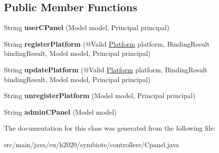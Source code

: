 \subsection*{Public Member Functions}
\begin{DoxyCompactItemize}
\item 
String {\bfseries user\+C\+Panel} (Model model, Principal principal)\hypertarget{classeu_1_1h2020_1_1symbiote_1_1controller_1_1Cpanel_a009092cae8a35727082ffced5b0fcc81}{}\label{classeu_1_1h2020_1_1symbiote_1_1controller_1_1Cpanel_a009092cae8a35727082ffced5b0fcc81}

\item 
String {\bfseries register\+Platform} (@Valid \hyperlink{classeu_1_1h2020_1_1symbiote_1_1model_1_1Platform}{Platform} platform, Binding\+Result binding\+Result, Model model, Principal principal)\hypertarget{classeu_1_1h2020_1_1symbiote_1_1controller_1_1Cpanel_ab67932ffbb8960df71f5bbca270b23f4}{}\label{classeu_1_1h2020_1_1symbiote_1_1controller_1_1Cpanel_ab67932ffbb8960df71f5bbca270b23f4}

\item 
String {\bfseries update\+Platform} (@Valid \hyperlink{classeu_1_1h2020_1_1symbiote_1_1model_1_1Platform}{Platform} platform, Binding\+Result binding\+Result, Model model, Principal principal)\hypertarget{classeu_1_1h2020_1_1symbiote_1_1controller_1_1Cpanel_abd4d2749f0068279db583cf328b27426}{}\label{classeu_1_1h2020_1_1symbiote_1_1controller_1_1Cpanel_abd4d2749f0068279db583cf328b27426}

\item 
String {\bfseries unregister\+Platform} (Model model, Principal principal)\hypertarget{classeu_1_1h2020_1_1symbiote_1_1controller_1_1Cpanel_a7afae63cc7bb39aaaaf8e9d6ee87d03f}{}\label{classeu_1_1h2020_1_1symbiote_1_1controller_1_1Cpanel_a7afae63cc7bb39aaaaf8e9d6ee87d03f}

\item 
String {\bfseries admin\+C\+Panel} (Model model)\hypertarget{classeu_1_1h2020_1_1symbiote_1_1controller_1_1Cpanel_ad0f6fb280ef1ac2658fa3852ec8c6dd9}{}\label{classeu_1_1h2020_1_1symbiote_1_1controller_1_1Cpanel_ad0f6fb280ef1ac2658fa3852ec8c6dd9}

\end{DoxyCompactItemize}


The documentation for this class was generated from the following file\+:\begin{DoxyCompactItemize}
\item 
src/main/java/eu/h2020/symbiote/controllers/Cpanel.\+java\end{DoxyCompactItemize}
